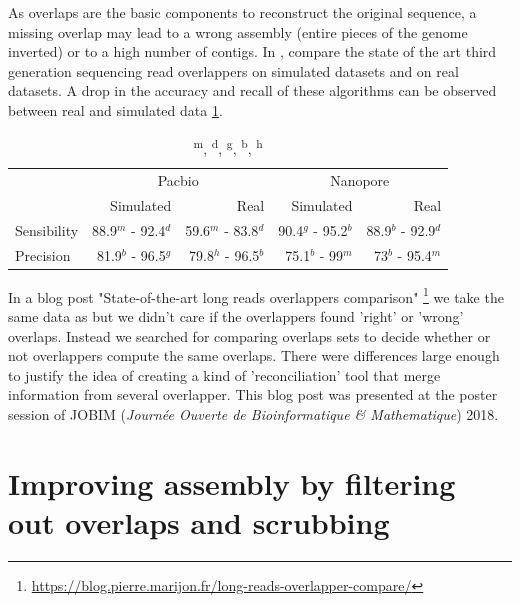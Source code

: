 \documentclass[main.tex]{subfiles}
\begin{document}
As overlaps are the basic components to reconstruct the original sequence, a missing overlap may lead to a wrong assembly (entire pieces of the genome inverted) or to a high number of contigs. In \cite{ovl_bench}, \citeauthor{ovl_bench} compare the state of the art third generation sequencing read overlappers on simulated datasets and on real datasets. A drop in the accuracy and recall of these algorithms can be observed between real and simulated data \ref{preassembly:tab:ovl_result}.
\begin{table}[ht]
    \centering
    \begin{tabular}{l|rr|rr}
                & \multicolumn{2}{c}{Pacbio}                & \multicolumn{2}{c}{Nanopore}              \\ 
                & Simulated           & Real                & Simulated         & Real                  \\ \hline
    Sensibility & 88.9$^m$ - 92.4$^d$ & 59.6$^m$ - 83.8$^d$ & 90.4$^g$ - 95.2$^b$ & 88.9$^b$ - 92.9$^d$ \\
    Precision   & 81.9$^b$ - 96.5$^g$ & 79.8$^h$ - 96.5$^b$ & 75.1$^b$ - 99$^m$   & 73$^b$ - 95.4$^m$   \\
    \end{tabular}
    \caption{\textsuperscript{m}, \textsuperscript{d}, \textsuperscript{g}, \textsuperscript{b}, \textsuperscript{h}\mhap}
    \label{preassembly:tab:ovl_result}
\end{table}

In a blog post "State-of-the-art long reads overlappers comparison" \footnote{\url{https://blog.pierre.marijon.fr/long-reads-overlapper-compare/}} we take the same data as \cite{ovl_bench} but we didn't care if the overlappers found 'right' or 'wrong' overlaps. Instead we searched for comparing overlaps sets to decide whether or not overlappers compute the same overlaps. There were differences large enough to justify the idea of creating a kind of 'reconciliation' tool that merge information from several overlapper. This blog post was presented at the poster session of JOBIM (\textit{Journée Ouverte de Bioinformatique \& Mathematique}) 2018.



\newpage

\section{Improving assembly by filtering out overlaps and scrubbing}
\end{document}

